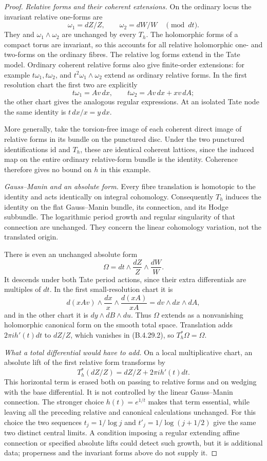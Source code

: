 \begin{proof}
\emph{Relative forms and their coherent extensions.}
On the ordinary locus the invariant relative
one-forms are
\[
 \omega_1=dZ/Z,\qquad \omega_2=dW/W
 \quad\pmod{dt}.
\]
They and $\omega_1\wedge\omega_2$ are
unchanged by every $T_h$. The holomorphic
forms of a compact torus are invariant, so
this accounts for all relative holomorphic
one- and two-forms on the ordinary fibres.
The relative log forms extend in the Tate
model. Ordinary coherent relative forms
also give finite-order extensions: for
example $t\omega_1,t\omega_2$, and
$t^2\omega_1\wedge\omega_2$ extend as
ordinary relative forms. In the first
resolution chart the first two are explicitly
\[
 t\omega_1=Av\,dx,\qquad
 t\omega_2=Av\,dx+xv\,dA;
\]
the other chart gives the analogous regular
expressions. At an isolated Tate node the
same identity is $t\,dx/x=y\,dx$.

More generally, take the torsion-free image
of each coherent direct image of relative
forms in its bundle on the punctured disc.
Under the two punctured identifications
$\mathrm{id}$ and $T_h$, these are identical
coherent lattices, since the induced map on
the entire ordinary relative-form bundle
is the identity. Coherence therefore gives
no bound on $h$ in this example.

\emph{Gauss--Manin and an absolute form.}
Every fibre translation is homotopic to the
identity and acts identically on integral
cohomology. Consequently $T_h$ induces the
identity on the flat Gauss--Manin bundle,
its connection, and its Hodge subbundle.
The logarithmic period growth and regular
singularity of that connection are unchanged.
They concern the linear cohomology variation,
not the translated origin.

There is even an unchanged absolute form
\[
 \Omega=dt\wedge\frac{dZ}{Z}\wedge\frac{dW}{W}.
 \tag{B.4.29.2}
\]
It descends under both Tate period actions,
since their extra differentials are multiples
of $dt$. In the first small-resolution chart
it is
\[
 d(xAv)\wedge\frac{dx}{x}
          \wedge\frac{d(xA)}{xA}
       =dv\wedge dx\wedge dA,
\]
and in the other chart it is
$dy\wedge dB\wedge du$.
Thus $\Omega$ extends as a nonvanishing
holomorphic canonical form on the smooth
total space. Translation adds
$2\pi i h'(t)dt$ to $dZ/Z$, which vanishes
in (B.4.29.2), so $T_h^*\Omega=\Omega$.

\emph{What a total differential would have to add.}
On a local multiplicative chart, an absolute
lift of the first relative form transforms by
\[
 T_h^*(dZ/Z)=dZ/Z+2\pi i h'(t)dt.
 \tag{B.4.29.3}
\]
This horizontal term is erased both on passing
to relative forms and on wedging with the base
differential. It is not controlled by the
linear Gauss--Manin connection. The stronger
choice $h(t)=e^{1/t}$ makes that term
essential, while leaving all the preceding
relative and canonical calculations unchanged.
For this choice the two sequences
$t_j=1/\log j$ and
$t'_j=1/\log(j+1/2)$ give the same two
distinct central limits. A condition imposing
a regular extending affine connection or
specified absolute lifts could detect such
growth, but it is additional data; properness
and the invariant forms above do not supply it.


\end{proof}
